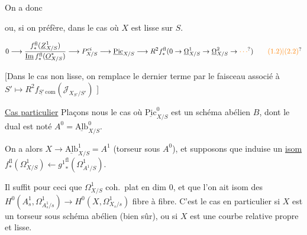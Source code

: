 
On a donc


ou, si on préfère, dans le cas où $X$ est lisse sur $S$.

\[
0\longrightarrow\frac{f_*^{\mathrm{fl}}(\underline{Z}^1_{X/S})}{\underline{\mathrm{Im}}\,f_*^{\mathrm{fl}}(\underline O^*_{X/S})}
\longrightarrow P^{ci}_{X/S}\longrightarrow\underline{\mathrm{Pic}}_{X/S}
\longrightarrow R^{2}f_*^{\mathrm{fl}}(0\to\underline\Omega^1_{X/S}\to\underline\Omega^2_{X/S}\to\unsure{\cdots})
\tag*{\unsure{(1.2)|(2.2)}}
\]

[Dans le cas non lisse, on remplace le dernier terme par  le faisceau associé à $S'\longmapsto R^2 f_{\underline{S'}\,\mathrm{com}}(\mathscr J_{X_{S'}/S'})$ ]


\uline{Cas particulier} Plaçons nous  le cas où $\underline{\mathrm{Pic}}^0_{X/S}$ est un schéma abélien $B$, dont le dual est noté $A^0=\underline{\mathrm{Alb}}^0_{X/S}$.

On a alors $X\to\underline{\mathrm{Alb}}^1_{X/S}=A^1$ (torseur sous $A^0$), et supposons que
induise un \uline{isom} $f_*^{\mathrm{fl}}(\Omega^1_{X/S})\longleftarrow {g^1}_*^{\mathrm{fl}}(\Omega^1_{A^1/S})$.

Il suffit pour ceci que  $\Omega^1_{X/S}$   coh.\ plat en dim 0, et que l'on ait isom des $H^0(A^1_s,\Omega^1_{A^1_s/s})\to H^0(X,\Omega^1_{X_s/s})$ fibre à fibre. C'est le cas en particulier si $X$ est un torseur sous schéma abélien (bien sûr), ou si $X$ est une courbe relative propre et lisse.

